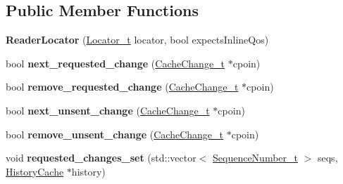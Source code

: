 \subsection*{\-Public \-Member \-Functions}
\begin{DoxyCompactItemize}
\item 
\hypertarget{classeprosima_1_1rtps_1_1_reader_locator_a758c88bc4791ac59b6590d6c85c761ce}{{\bfseries \-Reader\-Locator} (\hyperlink{structeprosima_1_1rtps_1_1_locator__t}{\-Locator\-\_\-t} locator, bool expects\-Inline\-Qos)}\label{classeprosima_1_1rtps_1_1_reader_locator_a758c88bc4791ac59b6590d6c85c761ce}

\item 
\hypertarget{classeprosima_1_1rtps_1_1_reader_locator_a4915e0a89d77bdea36676aeb43b64a9b}{bool {\bfseries next\-\_\-requested\-\_\-change} (\hyperlink{structeprosima_1_1rtps_1_1_cache_change__t}{\-Cache\-Change\-\_\-t} $\ast$cpoin)}\label{classeprosima_1_1rtps_1_1_reader_locator_a4915e0a89d77bdea36676aeb43b64a9b}

\item 
\hypertarget{classeprosima_1_1rtps_1_1_reader_locator_a66a893d20687f6f0b98f71e51d48f5a9}{bool {\bfseries remove\-\_\-requested\-\_\-change} (\hyperlink{structeprosima_1_1rtps_1_1_cache_change__t}{\-Cache\-Change\-\_\-t} $\ast$cpoin)}\label{classeprosima_1_1rtps_1_1_reader_locator_a66a893d20687f6f0b98f71e51d48f5a9}

\item 
\hypertarget{classeprosima_1_1rtps_1_1_reader_locator_ae3efda240f1a4ea839a5164c7c934ff6}{bool {\bfseries next\-\_\-unsent\-\_\-change} (\hyperlink{structeprosima_1_1rtps_1_1_cache_change__t}{\-Cache\-Change\-\_\-t} $\ast$cpoin)}\label{classeprosima_1_1rtps_1_1_reader_locator_ae3efda240f1a4ea839a5164c7c934ff6}

\item 
\hypertarget{classeprosima_1_1rtps_1_1_reader_locator_a2cf18dadff190d9943877c8a2429af51}{bool {\bfseries remove\-\_\-unsent\-\_\-change} (\hyperlink{structeprosima_1_1rtps_1_1_cache_change__t}{\-Cache\-Change\-\_\-t} $\ast$cpoin)}\label{classeprosima_1_1rtps_1_1_reader_locator_a2cf18dadff190d9943877c8a2429af51}

\item 
\hypertarget{classeprosima_1_1rtps_1_1_reader_locator_ac889bb912104ab3864dee6216b88b9b2}{void {\bfseries requested\-\_\-changes\-\_\-set} (std\-::vector$<$ \hyperlink{structeprosima_1_1rtps_1_1_sequence_number__t}{\-Sequence\-Number\-\_\-t} $>$ seqs, \hyperlink{classeprosima_1_1rtps_1_1_history_cache}{\-History\-Cache} $\ast$history)}\label{classeprosima_1_1rtps_1_1_reader_locator_ac889bb912104ab3864dee6216b88b9b2}

\end{DoxyCompactItemize}
